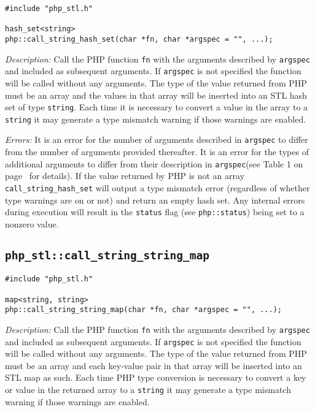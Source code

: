 \documentclass[11pt,titlepage]{article}
\begin{document}
\begin{verbatim}
#include "php_stl.h"

hash_set<string> 
php::call_string_hash_set(char *fn, char *argspec = "", ...);
\end{verbatim}

\emph{Description:} Call the PHP function \verb|fn| with the arguments described by \verb|argspec| and included as subsequent arguments. If \verb|argspec| is not specified the function will be called without any arguments. The type of the value returned from PHP must be an array and the values in that array will be inserted into an STL hash set of type \verb|string|. Each time it is necessary to convert a value in the array to a \verb|string| it may generate a type mismatch warning if those warnings are enabled.

\emph{Errors:} It is an error for the number of arguments described in \verb|argspec| to differ from the number of arguments provided thereafter. It is an error for the types of additional arguments to differ from their description in \verb|argspec|(see Table 1 on page~\pageref{Table1} for details). If the value returned by PHP is not an array \verb|call_string_hash_set| will output a type mismatch error (regardless of whether type warnings are on or not) and return an empty hash set. Any internal errors during execution will result in the \verb|status| flag (see \verb|php::status|) being set to a nonzero value.


\subsection{\texttt{php\_stl::call\_string\_string\_map}}

\begin{verbatim}
#include "php_stl.h"

map<string, string> 
php::call_string_string_map(char *fn, char *argspec = "", ...);
\end{verbatim}

\emph{Description:} Call the PHP function \verb|fn| with the arguments described by \verb|argspec| and included as subsequent arguments. If \verb|argspec| is not specified the function will be called without any arguments. The type of the value returned from PHP must be an array and each key-value pair in that array will be inserted into an STL map as such. Each time PHP type conversion is necessary to convert a key or value in the returned array to a \verb|string| it may generate a type mismatch warning if those warnings are enabled.
\end{document}
